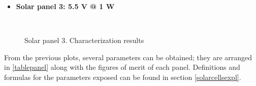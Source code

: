 \newpage

\begin{itemize} [noitemsep,topsep=0pt]
\item \textbf{Solar panel 3: 5.5 V @ 1 W}
\end{itemize}

\begin{figure}[H]
			\centering
			\\
			\caption{Solar panel 3. Characterization results} %
			\vspace{-2cm}
\end{figure}


\newpage

From the previous plots, several parameters can be obtained; they are arranged in \autoref{tablepanel} along with the figures of merit of each panel. Definitions and formulas for the parameters exposed can be found in section \ref{solarcellsexpl}.


